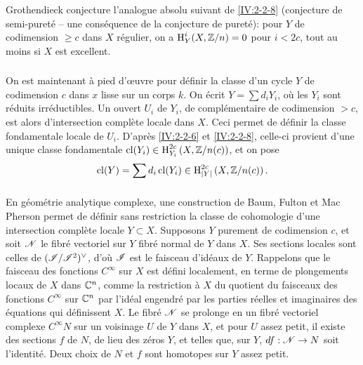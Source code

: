 \subsubsection{}\label{IV:2-2-9}

Grothendieck conjecture l'analogue absolu suivant de \ref{IV:2-2-8} (conjecture 
de semi-pureté -- une conséquence de la conjecture de pureté): pour $Y$ 
de codimension $\geqslant c$ dans $X$ régulier, on a $\operatorname{H}_Y^i(X,\mathbb{Z}/n)=0$ pour 
$i<2 c$, tout au moins si $X$ est excellent. 





\subsubsection{}\label{IV:2-2-10}

On est maintenant à pied d'œuvre pour définir la classe d'un cycle $Y$ de 
codimension $c$ dans $x$ lisse sur un corps $k$. On écrit $Y=\sum d_i Y_i$, 
où les $Y_i$ sont réduits irréductibles. Un ouvert $U_i$ de $Y_i$, de 
complémentaire de codimension $>c$, est alors d'intersection complète 
locale dans $X$. Ceci permet de définir la classe fondamentale locale de 
$U_i$. D'après \ref{IV:2-2-6} et \ref{IV:2-2-8}, celle-ci provient d'une 
unique classe fondamentale $\operatorname{cl}(Y_i)\in \operatorname{H}_{Y_i}^{2 c}\left(X,\mathbb{Z}/n(c)\right)$, 
et on pose 
\[
  \operatorname{cl}(Y) = \sum d_i \operatorname{cl}(Y_i) \in \operatorname{H}_{|Y|}^{2 c}\left(X,\mathbb{Z}/n(c)\right) \text{.}
\]





\subsubsection{}\label{IV:2-2-11}

En géométrie analytique complexe, une construction de Baum, Fulton et 
Mac Pherson \cite{bfm75} permet de définir sans restriction la classe de 
cohomologie d'une intersection complète locale $Y\subset X$. Supposons $Y$ 
purement de codimension $c$, et soit $\mathscr{N}$ le fibré vectoriel sur $Y$ fibré 
normal de $Y$ dans $X$. Ses sections locales sont celles de $(\mathscr{I}/\mathscr{I}^2)^\vee$, 
d'où $\mathscr{I}$ est le faisceau d'idéaux de $Y$. Rappelons que le faisceau des 
fonctions $C^\infty$ sur $X$ est défini localement, en terme de plongements 
locaux de $X$ dans $\mathbb{C}^n$, comme la restriction à $X$ du quotient du 
faisceaux des fonctions $C^\infty$ sur $\mathbb{C}^n$ par l'idéal engendré par les 
parties réelles et imaginaires des équations qui définissent $X$. Le 
fibré $\mathscr{N}$ se prolonge en un fibré vectoriel complexe $C^\infty N$ sur un 
voisinage $U$ de $Y$ dans $X$, et pour $U$ assez petit, il existe des sections 
$f$ de $N$, de lieu des zéros $Y$, et telles que, sur $Y$, $d f:\mathscr{N}\to N$ 
soit l'identité. Deux choix de $N$ et $f$ sont homotopes sur $Y$ assez petit. 

